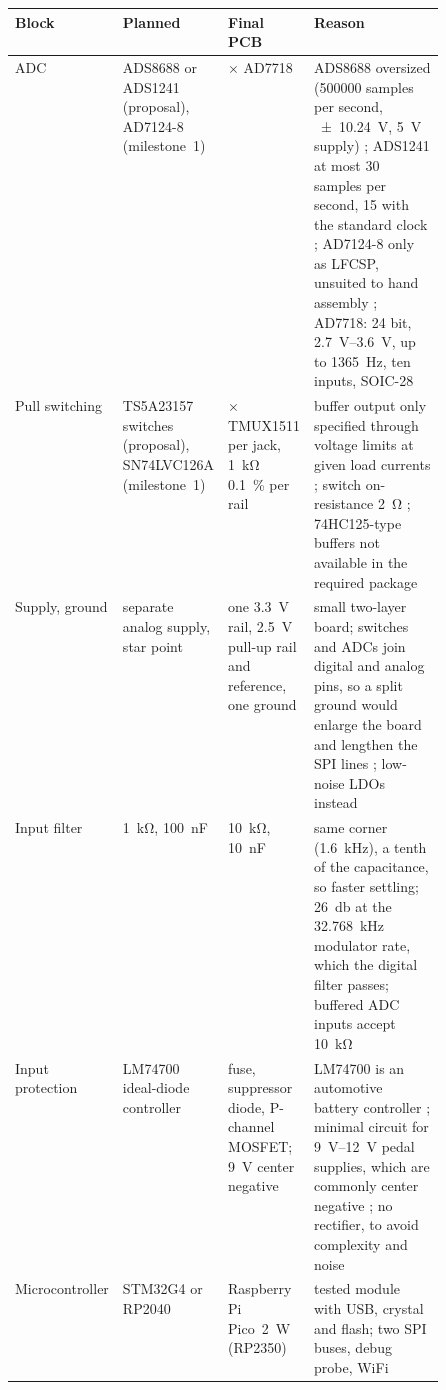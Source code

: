 \begin{table}[tb]
  \centering
  \footnotesize
  \label{tab:design-decisions}
  \begin{tabularx}{\linewidth}{@{}>{\raggedright\arraybackslash}p{0.12\linewidth} >{\raggedright\arraybackslash}p{0.19\linewidth} >{\raggedright\arraybackslash}p{0.19\linewidth} >{\raggedright\arraybackslash}X@{}}
    \toprule
    \textbf{Block} & \textbf{Planned} & \textbf{Final PCB} & \textbf{Reason} \\
    \midrule
    ADC & ADS8688 or ADS1241 (proposal), AD7124-8 (milestone~1) & 2$\times$ AD7718 & ADS8688 oversized (\num{500000} samples per second, \qty{+-10.24}{\volt}, \qty{5}{\volt} supply) \cite{ti2015ads8688}; ADS1241 at most 30 samples per second, 15 with the standard clock \cite{ti2013ads1241}; AD7124-8 only as LFCSP, unsuited to hand assembly \cite{adi2026ad7124}; AD7718: 24 bit, \qtyrange{2.7}{3.6}{\volt}, up to \qty{1365}{\hertz}, ten inputs, SOIC-28 \cite{adi2001ad7718} \\
    Pull switching & TS5A23157 switches \cite{ti2026ts5a23157} (proposal), SN74LVC126A (milestone~1) & 2$\times$ TMUX1511 per jack, \qty{1}{\kilo\ohm} \qty{0.1}{\percent} per rail & buffer output only specified through voltage limits at given load currents \cite{ti2026sn74lvc126a}; switch on-resistance \qty{2}{\ohm} \cite{ti2025tmux1511}; 74HC125-type buffers not available in the required package \\
    Supply, ground & separate analog supply, star point & one \qty{3.3}{\volt} rail, \qty{2.5}{\volt} pull-up rail and reference, one ground & small two-layer board; switches and ADCs join digital and analog pins, so a split ground would enlarge the board and lengthen the SPI lines \cite{kester2009mt031}; low-noise LDOs instead \cite{adi2025adp7142} \\
    Input filter & \qty{1}{\kilo\ohm}, \qty{100}{\nano\farad} & \qty{10}{\kilo\ohm}, \qty{10}{\nano\farad} & same corner (\qty{1.6}{\kilo\hertz}), a tenth of the capacitance, so faster settling; \qty{26}{\decibel} at the \qty{32.768}{\kilo\hertz} modulator rate, which the digital filter passes; buffered ADC inputs accept \qty{10}{\kilo\ohm} \cite{adi2001ad7718, andrews2015deltasigma} \\
    Input protection & LM74700 ideal-diode controller & fuse, suppressor diode, P-channel MOSFET; \qty{9}{\volt} center negative & LM74700 is an automotive battery controller \cite{ti2020lm74700}; minimal circuit for \qtyrange{9}{12}{\volt} pedal supplies, which are commonly center negative \cite{roland2026psas}; no rectifier, to avoid complexity and noise \\
    Micro\-controller & STM32G4 or RP2040 & Raspberry Pi Pico~2~W (RP2350) & tested module with USB, crystal and flash; two SPI buses, debug probe, WiFi \cite{rpi2026pico2w, rpi2026rp2350} \\
    \bottomrule
  \end{tabularx}
\end{table}

